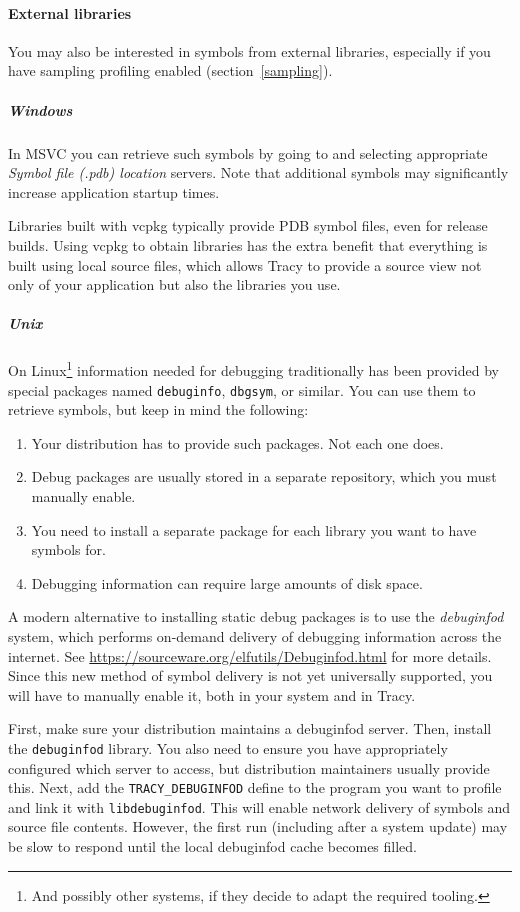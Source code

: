 \documentclass[hidelinks,titlepage,a4paper,twoside]{article}
\begin{document}
\paragraph{External libraries}

You may also be interested in symbols from external libraries, especially if you have sampling profiling enabled (section~\ref{sampling}).

\subparagraph{Windows}

In MSVC you can retrieve such symbols by going to  and selecting appropriate \emph{Symbol file (.pdb) location} servers. Note that additional symbols may significantly increase application startup times.

Libraries built with vcpkg typically provide PDB symbol files, even for release builds. Using vcpkg to obtain libraries has the extra benefit that everything is built using local source files, which allows Tracy to provide a source view not only of your application but also the libraries you use.

\subparagraph{Unix}

On Linux\footnote{And possibly other systems, if they decide to adapt the required tooling.} information needed for debugging traditionally has been provided by special packages named \texttt{debuginfo}, \texttt{dbgsym}, or similar. You can use them to retrieve symbols, but keep in mind the following:

\begin{enumerate}
\item Your distribution has to provide such packages. Not each one does.
\item Debug packages are usually stored in a separate repository, which you must manually enable.
\item You need to install a separate package for each library you want to have symbols for.
\item Debugging information can require large amounts of disk space.
\end{enumerate}

A modern alternative to installing static debug packages is to use the \emph{debuginfod} system, which performs on-demand delivery of debugging information across the internet. See \url{https://sourceware.org/elfutils/Debuginfod.html} for more details. Since this new method of symbol delivery is not yet universally supported, you will have to manually enable it, both in your system and in Tracy.

First, make sure your distribution maintains a debuginfod server. Then, install the \texttt{debuginfod} library. You also need to ensure you have appropriately configured which server to access, but distribution maintainers usually provide this. Next, add the \texttt{TRACY\_DEBUGINFOD} define to the program you want to profile and link it with \texttt{libdebuginfod}. This will enable network delivery of symbols and source file contents. However, the first run (including after a system update) may be slow to respond until the local debuginfod cache becomes filled.
\end{document}
